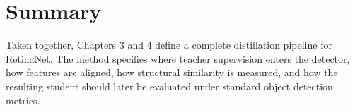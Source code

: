\section{Summary}

Taken together, Chapters 3 and 4 define a complete distillation pipeline for RetinaNet. The method specifies where teacher supervision enters the detector, how features are aligned, how structural similarity is measured, and how the resulting student should later be evaluated under standard object detection metrics.
